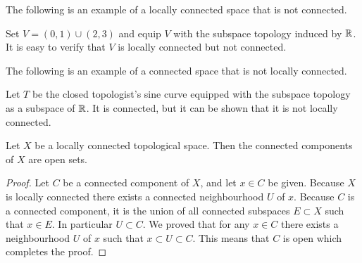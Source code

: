 \documentclass[11pt,a4paper]{article}
\begin{document}
The following is an example of a locally connected space that is not
connected.

\begin{example}
  Set $V = (0, 1) \cup (2, 3)$ and equip $V$ with the subspace topology
  induced by $\mathbb{R}$.
  It is easy to verify that $V$ is locally connected but not connected.
\end{example}

The following is an example of a connected space that is not locally 
connected.

\begin{example}
  Let $T$ be the closed topologist's sine curve equipped with the subspace
  topology as a subspace of $\mathbb{R}$. It is connected, but it can be shown that
  it is not locally connected.
\end{example}

\begin{proposition}
  Let $X$ be a locally connected topological space.
  Then the connected components of $X$ are open sets.
\end{proposition}
\begin{proof}
  Let $C$ be a connected component of $X$, and let $x \in C$ be given.
  Because $X$ is locally connected there exists a connected neighbourhood
  $U$ of $x$.
  Because $C$ is a connected component, it is the union of all connected
  subspaces $E \subset X$ such that $x \in E$.
  In particular $U \subset C$.
  We proved that for any $x \in C$ there exists a neighbourhood $U$ of
  $x$ such that $x \subset U \subset C$.
  This means that $C$ is open which completes the proof.
\end{proof}
\end{document}
